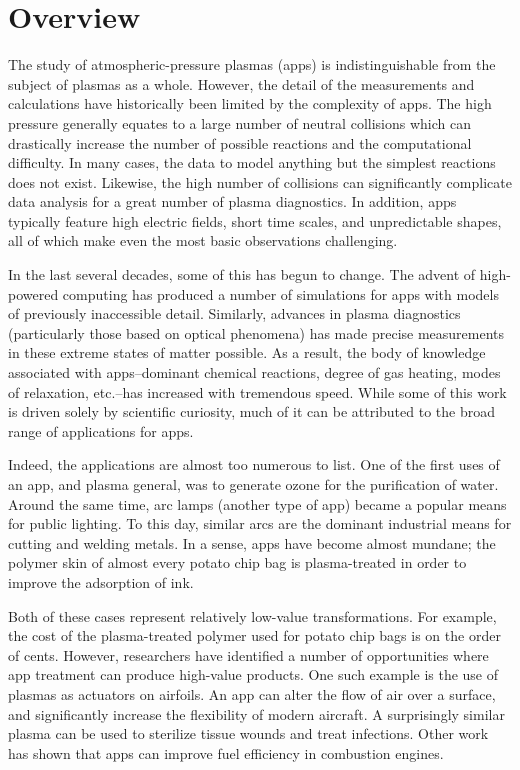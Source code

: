 \section{Overview}

The study of atmospheric-pressure plasmas (\acs{app}s) is indistinguishable from
the subject of plasmas as a whole. However, the detail of the measurements and
calculations have historically been limited by the complexity of \acs{app}s. The
high pressure generally equates to a large number of neutral collisions which
can drastically increase the number of possible reactions and the computational
difficulty. In many cases, the data to model anything but the simplest reactions
does not exist. Likewise, the high number of collisions can significantly
complicate data analysis for a great number of plasma diagnostics. In addition,
\acs{app}s typically feature high electric fields, short time scales, and
unpredictable shapes, all of which make even the most basic observations
challenging.

In the last several decades, some of this has begun to change. The advent of
high-powered computing has produced a number of simulations for \acs{app}s with
models of previously inaccessible detail. Similarly, advances in plasma
diagnostics (particularly those based on optical phenomena) has made precise
measurements in these extreme states of matter possible. As a result, the body
of knowledge associated with \acs{app}s--dominant chemical reactions, degree of
gas heating, modes of relaxation, etc.--has increased with tremendous speed.
While some of this work is driven solely by scientific curiosity, much of it can
be attributed to the broad range of applications for \acs{app}s.

Indeed, the applications are almost too numerous to list. One of the first uses
of an \acs{app}, and plasma general, was to generate ozone for the purification
of water. Around the same time, arc lamps (another type of \acs{app}) became a
popular means for public lighting. To this day, similar arcs are the dominant
industrial means for cutting and welding metals. In a sense, \acs{app}s have
become almost mundane; the polymer skin of almost every potato chip bag is
plasma-treated in order to improve the adsorption of ink.

Both of these cases represent relatively low-value transformations. For example,
the cost of the plasma-treated polymer used for potato chip bags is on the order
of cents. However, researchers have identified a number of opportunities where
\acs{app} treatment can produce high-value products. One such example is the use
of plasmas as actuators on airfoils. An \acs{app} can alter the flow of air over
a surface, and significantly increase the flexibility of modern aircraft. A
surprisingly similar plasma can be used to sterilize tissue wounds and treat
infections. Other work has shown that \acs{app}s can improve fuel efficiency in
combustion engines.

